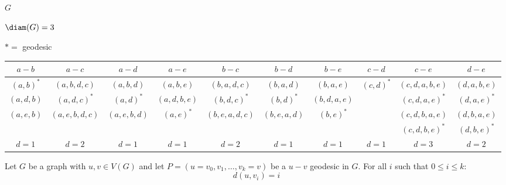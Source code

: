 \documentclass[letterpaper,12pt,fleqn]{article}
\begin{document}
\begin{example}
  \begin{minipage}{4in}
    \begin{center}
      
      \(G\)
    \end{center}
  \end{minipage}
  \begin{minipage}{2in}
    \(\diam(G)=3\)

    \bigskip

    \(*=\) geodesic
  \end{minipage}

  \bigskip

  \begin{adjustbox}{width=\textwidth}
    \begin{tabular}{c|c|c|c|c|c|c|c|c|c}
      \(a-b\) & \(a-c\) & \(a-d\) & \(a-e\) &\(b-c\) & \(b-d\) & \(b-e\) & \(c-d\) & \(c-e\) & \(d-e\) \\
      \hline
      \((a,b)^*\) & \((a,b,d,c)\) & \((a,b,d)\) & \((a,b,e)\) & \((b,a,d,c)\) & \((b,a,d)\) & \((b,a,e)\) &
      \((c,d)^*\) &
      \((c,d,a,b,e)\) & \((d,a,b,e)\) \\
      \((a,d,b)\) & \((a,d,c)^*\) & \((a,d)^*\) & \((a,d,b,e)\) & \((b,d,c)^*\) & \((b,d)^*\) & \((b,d,a,e)\) & &
      \((c,d,a,e)^*\) & \((d,a,e)^*\) \\
      \((a,e,b)\) & \((a,e,b,d,c)\) & \((a,e,b,d)\) & \((a,e)^*\) & \((b,e,a,d,c)\) & \((b,e,a,d)\) & \((b,e)^*\) & &
      \((c,d,b,a,e)\) & \((d,b,a,e)\) \\
      & & & & & & & & \((c,d,b,e)^*\) & \((d,b,e)^*\) \\
      \hline
      \(d=1\) & \(d=2\) & \(d=1\) & \(d=1\) & \(d=2\) & \(d=1\) & \(d=1\) & \(d=1\) & \(d=3\) & \(d=2\) \\
    \end{tabular}
  \end{adjustbox}
\end{example}

\bigskip

\begin{theorem}
  Let \(G\) be a graph with \(u,v\in V(G)\) and let \(P=(u=v_0,v_1,\ldots,v_k=v)\) be a \(u-v\) geodesic in \(G\).
  For all \(i\) such that \(0\le i\le k\):
  \[d(u,v_i)=i\]
\end{theorem}
\end{document}
